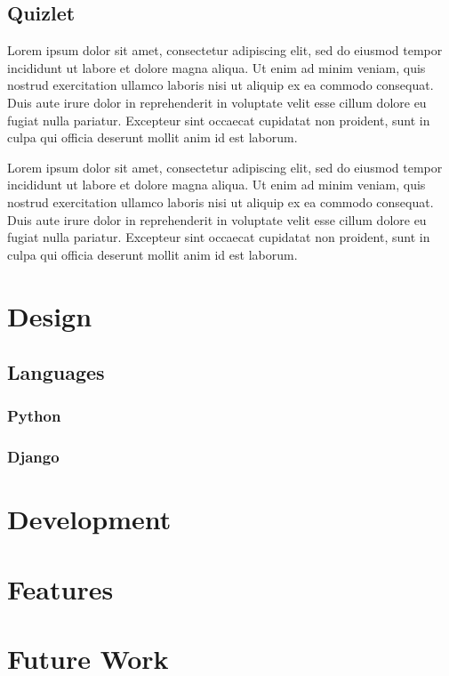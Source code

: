 \documentclass{article}
\begin{document}
\subsection{Quizlet}

Lorem ipsum dolor sit amet, consectetur adipiscing elit, sed do eiusmod tempor incididunt ut labore et dolore magna aliqua. Ut enim ad minim veniam, quis nostrud exercitation ullamco laboris nisi ut aliquip ex ea commodo consequat. Duis aute irure dolor in reprehenderit in voluptate velit esse cillum dolore eu fugiat nulla pariatur. Excepteur sint occaecat cupidatat non proident, sunt in culpa qui officia deserunt mollit anim id est laborum.

Lorem ipsum dolor sit amet, consectetur adipiscing elit, sed do eiusmod tempor incididunt ut labore et dolore magna aliqua. Ut enim ad minim veniam, quis nostrud exercitation ullamco laboris nisi ut aliquip ex ea commodo consequat. Duis aute irure dolor in reprehenderit in voluptate velit esse cillum dolore eu fugiat nulla pariatur. Excepteur sint occaecat cupidatat non proident, sunt in culpa qui officia deserunt mollit anim id est laborum.

\section{Design}
	\subsection{Languages}
		\subsubsection{Python}
		\subsubsection{Django}
\section{Development}
\section{Features}
\section{Future Work}

\printbibliography[title={Bibliography}]
\end{document}
